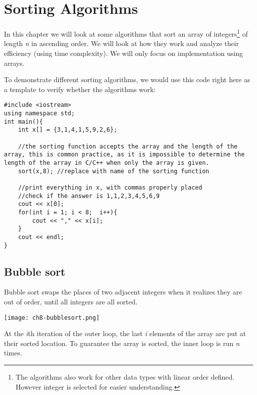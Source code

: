 \chapter{Sorting Algorithms}

In this chapter we will look at some algorithms that sort an array of integers\footnote{The algorithms also work for other data types with linear order defined. However integer is selected for easier understanding.} of length \textit{n} in ascending order. We will look at how they work and analyze their efficiency (using time complexity). We will only focus on implementation using arrays.

To demonstrate different sorting algorithms, we would use this code right here as a template to verify whether the algorithms work:

\begin{lstlisting}
#include <iostream>
using namespace std;
int main(){
    int x[] = {3,1,4,1,5,9,2,6};
    
    //the sorting function accepts the array and the length of the array, this is common practice, as it is impossible to determine the length of the array in C/C++ when only the array is given.
    sort(x,8); //replace with name of the sorting function

    //print everything in x, with commas properly placed
    //check if the answer is 1,1,2,3,4,5,6,9
    cout << x[0];
    for(int i = 1; i < 8;  i++){
        cout << "," << x[i];
    }
    cout << endl;
}
\end{lstlisting}
\pagebreak
\section{Bubble sort}

Bubble sort swaps the places of two adjacent integers when it realizes they are out of order, until all integers are all sorted.

\texttt{[image: ch8-bubblesort.png]}

\pagebreak


\pagebreak

At the \textit{i}th iteration of the outer loop, the last \textit{i} elements of the array are put at their sorted location. To guarantee the array is sorted, the inner loop is run \textit{n} times.



